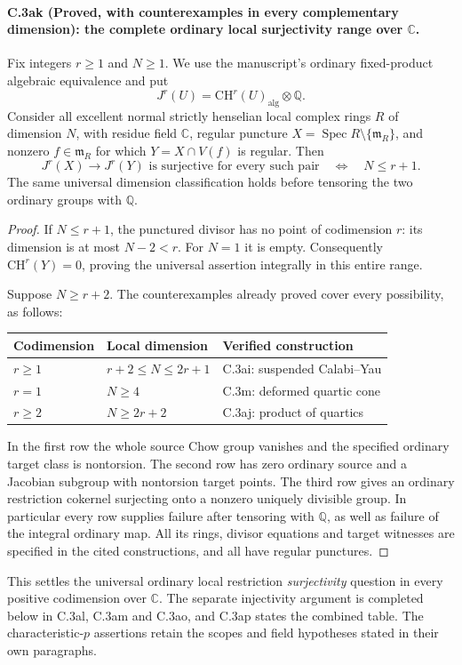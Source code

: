 \paragraph{C.3ak (Proved, with counterexamples in every complementary dimension): the complete ordinary local surjectivity range over $\mathbb C$.}
Fix integers $r\ge1$ and $N\ge1$. We use the manuscript's
ordinary fixed-product algebraic equivalence and put
\[
        J^r(U)=\mathrm{CH}^r(U)_{\mathrm{alg}}\otimes\mathbb Q.
\]
Consider all excellent normal strictly henselian local
complex rings $R$ of dimension $N$, with residue field
$\mathbb C$, regular puncture
$X=\operatorname{Spec}R\setminus\{\mathfrak m_R\}$, and
nonzero $f\in\mathfrak m_R$ for which
$Y=X\cap V(f)$ is regular. Then
\[
 \boxed{\quad
 J^r(X)\longrightarrow J^r(Y)
 \text{ is surjective for every such pair}
       \quad\Longleftrightarrow\quad N\le r+1.
 \quad}
\]
The same universal dimension classification holds before
tensoring the two ordinary groups with $\mathbb Q$.

\begin{proof}
If $N\le r+1$, the punctured divisor has no point of
codimension $r$: its dimension is at most $N-2<r$.
For $N=1$ it is empty. Consequently
$\mathrm{CH}^r(Y)=0$, proving the universal assertion
integrally in this entire range.

Suppose $N\ge r+2$. The counterexamples already proved
cover every possibility, as follows:
\begin{center}
\begin{tabular}{lll}
\toprule
Codimension & Local dimension & Verified construction \\
\midrule
$r\ge1$ & $r+2\le N\le2r+1$ & C.3ai: suspended Calabi--Yau \\
$r=1$ & $N\ge4$ & C.3m: deformed quartic cone \\
$r\ge2$ & $N\ge2r+2$ & C.3aj: product of quartics \\
\bottomrule
\end{tabular}
\end{center}
In the first row the whole source Chow group vanishes and
the specified ordinary target class is nontorsion. The
second row has zero ordinary source and a Jacobian subgroup
with nontorsion target points. The third row gives an
ordinary restriction cokernel surjecting onto a nonzero
uniquely divisible group. In particular every row supplies
failure after tensoring with $\mathbb Q$, as well as failure
of the integral ordinary map. All its rings, divisor
equations and target witnesses are specified in the cited
constructions, and all have regular punctures.
\end{proof}

This settles the universal ordinary local restriction
\emph{surjectivity} question in every positive codimension
over $\mathbb C$. The separate injectivity argument is
completed below in C.3al, C.3am and C.3ao, and C.3ap
states the combined table. The
characteristic-$p$ assertions retain the scopes and field
hypotheses stated in their own paragraphs.
